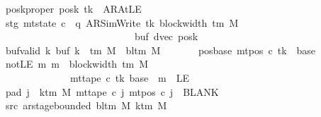 \begin{isabellebody}
\ \ \ \ \ \ \ poskproper{\isacharcolon}{\kern0pt}\ {\isachardoublequoteopen}posk\ tk\ {\isasymnoteq}\ AR{\isacharunderscore}{\kern0pt}AtLE{\isachardoublequoteclose}\isanewline
\ \ \ \ \ \ \ stg{\isacharcolon}{\kern0pt}\ {\isachardoublequoteopen}mt{\isacharunderscore}{\kern0pt}state\ c{}\ {\isacharequal}{\kern0pt}\ {\isacharparenleft}{\kern0pt}q{\isacharcomma}{\kern0pt}\ AR{\isacharunderscore}{\kern0pt}SimWrite{\isacharcomma}{\kern0pt}\ tk{\isacharcomma}{\kern0pt}\ block{\isacharunderscore}{\kern0pt}width\ {\isacharparenleft}{\kern0pt}{\isasymGamma}{\isacharunderscore}{\kern0pt}tm\ M{\isacharparenright}{\kern0pt}{\isacharcomma}{\kern0pt}\isanewline
\ \ \ \ \ \ \ \ \ \ \ \ \ \ \ \ \ \ \ \ \ \ \ \ \ \ \ \ \ \ \ \ \ buf{\isacharcomma}{\kern0pt}\ dvec{\isacharcomma}{\kern0pt}\ posk{\isacharparenright}{\kern0pt}{\isachardoublequoteclose}\isanewline
\ \ \ \ \ \ \ buf{\isacharunderscore}{\kern0pt}valid{\isacharcolon}{\kern0pt}\ {\isachardoublequoteopen}{\isasymforall}k{\isachardot}{\kern0pt}\ buf\ k\ {\isasymin}\ {\isasymGamma}{\isacharunderscore}{\kern0pt}tm\ M\ {\isasymunion}\ {\isacharbraceleft}{\kern0pt}bl{\isacharunderscore}{\kern0pt}tm\ M{\isacharbraceright}{\kern0pt}{\isachardoublequoteclose}\isanewline
\ \ \ \ \ \ \ pos{\isacharunderscore}{\kern0pt}base{\isacharcolon}{\kern0pt}\ {\isachardoublequoteopen}mt{\isacharunderscore}{\kern0pt}pos\ c{}\ tk\ {\isacharequal}{\kern0pt}\ base{\isachardoublequoteclose}\isanewline
\ \ \ \ \ \ \ notLE{\isacharcolon}{\kern0pt}\ {\isachardoublequoteopen}{\isasymAnd}m{\isachardot}{\kern0pt}\ m\ {\isacharless}{\kern0pt}\ block{\isacharunderscore}{\kern0pt}width\ {\isacharparenleft}{\kern0pt}{\isasymGamma}{\isacharunderscore}{\kern0pt}tm\ M{\isacharparenright}{\kern0pt}\isanewline
\ \ \ \ \ \ \ \ \ \ \ \ \ \ \ \ \ \ \ {\isasymLongrightarrow}\ mt{\isacharunderscore}{\kern0pt}tape\ c{}\ tk\ {\isacharparenleft}{\kern0pt}base\ {\isacharplus}{\kern0pt}\ m{\isacharparenright}{\kern0pt}\ {\isasymnoteq}\ LE{}{\isachardoublequoteclose}\isanewline
\ \ \ \ \ \ \ pad{}{\isacharcolon}{\kern0pt}\ {\isachardoublequoteopen}{\isasymforall}j\ {\isasymge}\ k{\isacharunderscore}{\kern0pt}tm\ M{\isachardot}{\kern0pt}\ mt{\isacharunderscore}{\kern0pt}tape\ c{}\ j\ {\isacharparenleft}{\kern0pt}mt{\isacharunderscore}{\kern0pt}pos\ c{}\ j{\isacharparenright}{\kern0pt}\ {\isacharequal}{\kern0pt}\ BLANK{}{\isachardoublequoteclose}\isanewline
\ \ \ \ \ \ \ src{}{\isacharcolon}{\kern0pt}\ {\isachardoublequoteopen}ar{\isacharunderscore}{\kern0pt}stage{\isacharunderscore}{\kern0pt}bounded\ {\isacharparenleft}{\kern0pt}bl{\isacharunderscore}{\kern0pt}tm\ M{\isacharparenright}{\kern0pt}\ {\isacharparenleft}{\kern0pt}k{\isacharunderscore}{\kern0pt}tm\ M{\isacharparenright}{\kern0pt}\isanewline

\end{isabellebody}
